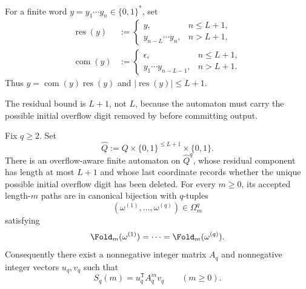 \begin{definition}
\label{def:appendix-cut}
For a finite word \(y=y_1\cdots y_n\in\{0,1\}^*\), set
\[
\begin{aligned}
  \operatorname{res}(y)
  &:=
  \begin{cases}
    y, & n\le L+1,\\
    y_{n-L}\cdots y_n, & n>L+1,
  \end{cases}\\
  \operatorname{com}(y)
  &:=
  \begin{cases}
    \epsilon, & n\le L+1,\\
    y_1\cdots y_{n-L-1}, & n>L+1.
  \end{cases}
\end{aligned}
\]
Thus \(y=\operatorname{com}(y)\operatorname{res}(y)\) and
\(|\operatorname{res}(y)|\le L+1\).
\end{definition}

\begin{remark}
The residual bound is \(L+1\), not \(L\), because the automaton must carry the
possible initial overflow digit removed by 
before committing output.
\end{remark}

\begin{proposition}
\label{prop:appendix-collision-automaton}
Fix \(q\ge 2\).  Set
\[
  \widehat Q:=Q\times\{0,1\}^{\le L+1}\times\{0,1\}.
\]
There is an overflow-aware finite automaton on \(\widehat Q^q\), whose residual
component has length at most \(L+1\) and whose last coordinate records whether
the unique possible initial overflow digit has been deleted.  For every
\(m\ge 0\), its accepted length-\(m\) paths are in canonical bijection with
\(q\)-tuples
\[
  (\omega^{(1)},\dots,\omega^{(q)})\in\Omega_m^q
\]
satisfying
\[
  \Fold_m(\omega^{(1)})=\cdots=\Fold_m(\omega^{(q)}).
\]
Consequently there exist a nonnegative integer matrix \(A_q\) and nonnegative
integer vectors \(u_q,v_q\) such that
\[
  S_q(m)=u_q^{\mathsf T}A_q^m v_q
  \qquad (m\ge 0).
\]
\end{proposition}

